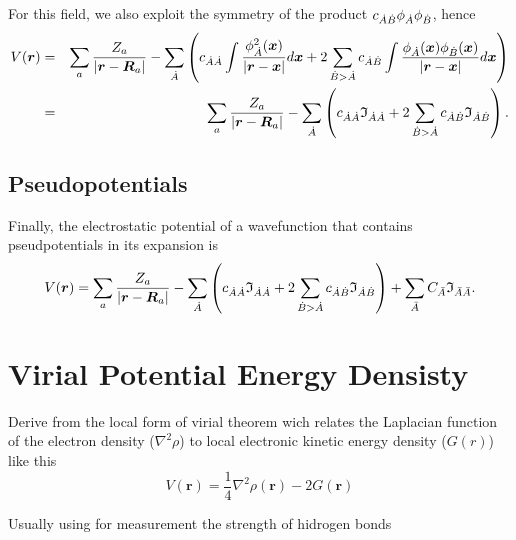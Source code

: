 For this field, we also exploit the symmetry of the product $c_{\dot{A}\dot{B}}\phi_{\dot{A}}\phi_{\dot{B}}$, hence
%
\begin{eqnarray}
   V(\boldsymbol{r})&=&\sum_a\frac{Z_a}{|\boldsymbol{r}-\boldsymbol{R}_a|}-
   \sum_{\dot{A}}\left(c_{\dot{A}\dot{A}}\int\frac{\phi_{\dot{A}}^2(\boldsymbol{x})}{|\boldsymbol{r}-\boldsymbol{x}|}d\boldsymbol{x}+2\sum_{\dot{B}>\dot{A}}c_{\dot{A}\dot{B}}\int\frac{\phi_{\dot{A}}(\boldsymbol{x})\phi_{\dot{B}}(\boldsymbol{x})}{|\boldsymbol{r}-\boldsymbol{x}|}d\boldsymbol{x}\right)\nonumber\\
   &=&\sum_a\frac{Z_a}{|\boldsymbol{r}-\boldsymbol{R}_a|}-
   \sum_{\dot{A}}\left(c_{\dot{A}\dot{A}}\mathfrak{I}_{\dot{A}\dot{A}}+2\sum_{\dot{B}>\dot{A}}c_{\dot{A}\dot{B}}\mathfrak{I}_{\dot{A}\dot{B}}\right).
\end{eqnarray}
%

\subsection{Pseudopotentials}

Finally, the electrostatic potential of a wavefunction that contains pseudpotentials
in its expansion is
%
\begin{equation}%
  V(\boldsymbol{r})=\sum_a\frac{Z_a}{|\boldsymbol{r}-\boldsymbol{R}_a|}-
   \sum_{\dA}\left(c_{\dA\dA}\mathfrak{I}_{\dA\dA}+
   2\sum_{\dB>\dA}c_{\dA\dB}\mathfrak{I}_{\dA\dB}\right)+
   \sum_{\bA}C_{\bA}\mathfrak{I}_{\bA\bA}.
\end{equation}
%

\section{Virial Potential Energy Densisty}
Derive from the local form of virial theorem wich relates the Laplacian function of the electron
density ($\nabla^2\rho$) to local electronic kinetic energy density ($G(r)$) like this 
\begin{equation}
	V(\boldsymbol{r})= \frac{1}{4} \nabla^2\rho(\boldsymbol{r})-2G(\boldsymbol{r})	
\end{equation}

Usually using for measurement the strength of hidrogen bonds

